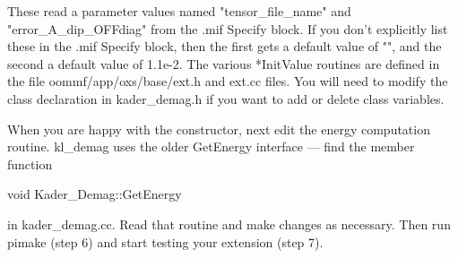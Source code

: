 {These read a parameter values named "tensor_file_name" and
"error_A_dip_OFFdiag" from the .mif Specify block.  If you don't
explicitly list these in the .mif Specify block, then the first gets a
default value of "", and the second a default value of 1.1e-2.  The
various *InitValue routines are defined in the file
oommf/app/oxs/base/ext.h and ext.cc files.  You will need to modify the
class declaration in kader_demag.h if you want to add or delete class
variables.

When you are happy with the constructor, next edit the energy
computation routine.  kl_demag uses the older GetEnergy interface ---
find the member function

    void Kader_Demag::GetEnergy

in kader_demag.cc.  Read that routine and make changes as necessary.
Then run pimake (step 6) and start testing your extension (step 7).
}
